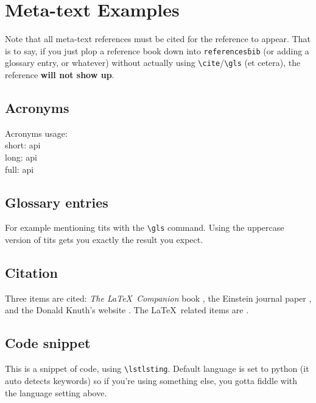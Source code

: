 \documentclass[12pt]{article}
\begin{document}
	\section{Meta-text Examples}
    Note that all meta-text references must be cited for the reference to appear. That is to say, if you just plop a reference book down into \texttt{references\.bib} (or adding a glossary entry, or whatever) without actually using \texttt{\textbackslash cite}/\texttt{\textbackslash gls} (et cetera), the reference \textbf{will not show up}.
    
	\subsection{Acronyms}
	
	Acronyms usage: 
	\\ short: \acrshort{api} 
	\\ long: \acrlong{api}
	\\ full: \acrfull{api}
	
	
	\subsection{Glossary entries}
	
	For example mentioning \gls{tits} with the \texttt{\textbackslash gls} command. Using the uppercase version of \Gls{tits} gets you exactly the result you expect.

	\subsection{Citation}

	Three items are cited: \textit{The \LaTeX\ Companion} book \cite{latexcompanion}, the Einstein journal paper \cite{einstein}, and the Donald Knuth's website \cite{knuthwebsite}. The \LaTeX\ related items are \cite{latexcompanion,knuthwebsite}.
	\subsection{Code snippet}
	
    This is a snippet of code, using \texttt{\textbackslash lstlsting}. Default language is set to python (it auto detects keywords) so if you're using something else, you gotta fiddle with the language setting above.
    
\end{document}
